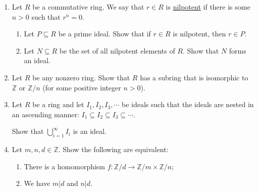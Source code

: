 \documentclass [12pt] {article}
\newcommand{\Z}{\mathbb{Z}}
\begin{document}
\begin{enumerate}

\item Let $R$ be a commutative ring. We say that $r\in R$ is \underline{nilpotent} if there is some $n>0$ such that $r^n=0$. 

    \begin{enumerate}
        \item Let $P\subseteq R$ be a prime ideal. Show that if $r\in R$ is nilpotent, then $r\in P$. 

        \item Let $N\subseteq R$ be the set of all nilpotent elements of $R$. Show that $N$ forms an ideal. 
    \end{enumerate}

\item Let $R$ be any nonzero ring. Show that $R$ has a subring that is isomorphic to $\Z$ or $\Z/n$ (for some positive integer $n>0$).

\item Let $R$ be a ring and let $I_1,I_2,I_3,\cdots $ be ideals such that the ideals are nested in an ascending manner: $I_1\subseteq I_2\subseteq I_3\subseteq\cdots$.

Show that $\bigcup\limits_{i=1}^\infty I_i$ is an ideal. 

\item Let $m,n,d\in \Z$. Show the following are equivalent: 
\begin{enumerate}
    \item There is a homomorphism $f:\Z/d\to \Z/m\times \Z/n$;
    \item We have $m|d$ and $n|d$.
\end{enumerate}
\end{enumerate}
\end{document}
